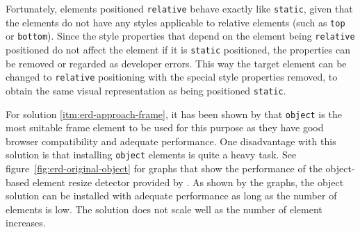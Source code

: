 \documentclass[a4paper,11pt]{kth-mag}
\newcommand{\code}[1]{\texttt{#1}}
\begin{document}
\begin{itemize}
            Fortunately, \glspl{element} positioned \code{relative} behave exactly like \code{static}, given that the \glspl{element} do not have any styles applicable to relative elements (such as \code{top} or \code{bottom}).
            Since the style properties that depend on the \gls{element} being \code{relative} positioned do not affect the \gls{element} if it is \code{static} positioned, the properties can be removed or regarded as developer errors.
            This way the target \gls{element} can be changed to \code{relative} positioning with the special style properties removed, to obtain the same visual representation as being positioned \code{static}.
        \end{itemize}

        For solution \ref{itm:erd-approach-frame}, it has been shown by \cite{backalley} that \code{object} is the most suitable frame \gls{element} to be used for this purpose as they have good \gls{browser} compatibility and adequate performance.
        One disadvantage with this solution is that installing \code{object} elements is quite a heavy task.
        See figure~\ref{fig:erd-original-object} for graphs that show the performance of the object-based element resize detector provided by \cite{backalley}.
        As shown by the graphs, the object solution can be installed with adequate performance as long as the number of elements is low.
        The solution does not scale well as the number of element increases.
\end{document}
